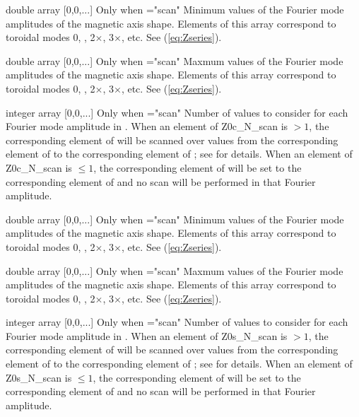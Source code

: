 \myhrule

{double array}
{[0,0,...]}
{Only when ={\ttfamily "scan"}}
{Minimum values of the Fourier mode amplitudes of the magnetic axis shape. Elements of this array correspond to toroidal modes 0, , 2$\times$, 3$\times$, etc.  See (\ref{eq:Zseries}).
}

\myhrule

{double array}
{[0,0,...]}
{Only when ={\ttfamily "scan"}}
{Maxmum values of the Fourier mode amplitudes of the magnetic axis shape. Elements of this array correspond to toroidal modes 0, , 2$\times$, 3$\times$, etc.  See (\ref{eq:Zseries}).
}

\myhrule

{integer array}
{[0,0,...]}
{Only when ={\ttfamily "scan"}}
{Number of values to consider for each Fourier mode amplitude in . When an element of {\ttfamily Z0c\_N\_scan} is $>1$, the corresponding element of  will be scanned over  values from the corresponding element of  to the corresponding element of ; see  for details.  When an element of {\ttfamily Z0c\_N\_scan} is $\le 1$, the corresponding element of  will be set to the corresponding element of  and no scan will be performed in that Fourier amplitude.
}

\myhrule

{double array}
{[0,0,...]}
{Only when ={\ttfamily "scan"}}
{Minimum values of the Fourier mode amplitudes of the magnetic axis shape. Elements of this array correspond to toroidal modes 0, , 2$\times$, 3$\times$, etc.  See (\ref{eq:Zseries}).
}

\myhrule

{double array}
{[0,0,...]}
{Only when ={\ttfamily "scan"}}
{Maxmum values of the Fourier mode amplitudes of the magnetic axis shape. Elements of this array correspond to toroidal modes 0, , 2$\times$, 3$\times$, etc.  See (\ref{eq:Zseries}).
}

\myhrule

{integer array}
{[0,0,...]}
{Only when ={\ttfamily "scan"}}
{Number of values to consider for each Fourier mode amplitude in . When an element of {\ttfamily Z0s\_N\_scan} is $>1$, the corresponding element of  will be scanned over  values from the corresponding element of  to the corresponding element of ; see  for details.  When an element of {\ttfamily Z0s\_N\_scan} is $\le 1$, the corresponding element of  will be set to the corresponding element of  and no scan will be performed in that Fourier amplitude.
}

